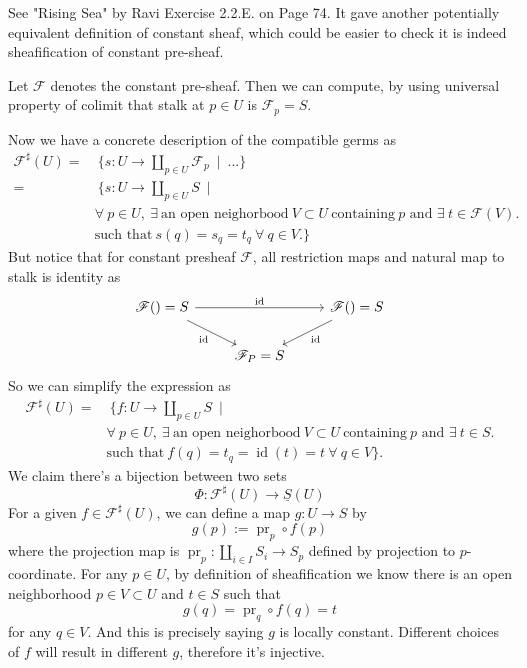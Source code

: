 See "Rising Sea" by Ravi Exercise 2.2.E. on Page 74. It gave another potentially equivalent definition of constant sheaf, which could be easier to check it is indeed sheafification of constant pre-sheaf.

Let $\mathscr F$ denotes the constant pre-sheaf. Then we can compute, by using universal property of colimit that stalk at $p\in U$ is $\mathscr F_p=S$. 

Now we have a concrete description of the compatible germs as 
\begin{align*}
    \mathscr F^{\sharp}(U)=&~\{s:U\to\amalg_{p\in U}\mathscr F_p ~\mid~ ...\}\\
    =&~\{s:U\to \amalg_{p\in U}S ~\mid~ \\
    &\forall~ p\in U,~ \exists~ \text{an open neighorbood}~ V\subset U~ \text{containing}~ p \text{ and } \exists~ t\in \mathscr F(V).\\
    &\text{such that}~ s(q)=s_q=t_q ~\forall~ q\in V.\}
\end{align*}
But notice that for constant presheaf $\mathscr F$, all restriction maps and natural map to stalk is identity as
\[\begin{tikzcd}
	{\mathscr F()=S} && {\mathscr F()=S} \\
	& {\mathscr F_P=S}
	\arrow["{\text{id}}", from=1-1, to=1-3]
	\arrow["{\text{id}}"', from=1-1, to=2-2]
	\arrow["{\text{id}}", from=1-3, to=2-2]
\end{tikzcd}\]
So we can simplify the expression as 
\begin{align*}
    \mathscr F^{\sharp}(U)=&~\{f:U\to \amalg_{p\in U}S ~\mid~ \\
    &\forall~ p\in U,~ \exists~ \text{an open neighorbood}~ V\subset U~ \text{containing}~ p \text{ and } \exists~ t\in S.\\
    &\text{such that}~ f(q)=t_q=\operatorname{id}(t)=t ~\forall~ q\in V\}.
\end{align*}
We claim there's a bijection between two sets 
\[\Phi:\mathscr F^{\sharp}(U)\to\underline{S}(U)\]
For a given $f\in\mathscr F^{\sharp}(U)$, we can define a map $g:U\to S$ by 
\[g(p):= \operatorname{pr}_{p}\circ f(p)\] where the projection map is $\operatorname{pr}_{p}:\amalg_{i\in I} S_i\to S_p$ defined by projection to $p$-coordinate. For any $p\in U$, by definition of sheafification we know there is an open neighborhood $p\in V\subset U$ and $t\in S$ such that 
\[g(q)=\operatorname{pr}_{q}\circ f(q)=t\] for any $q\in V$. And this is precisely saying $g$ is locally constant. Different choices of $f$ will result in different $g$, therefore it's injective. 

